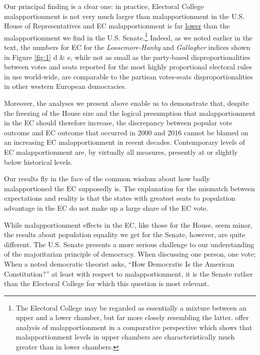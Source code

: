 Our principal finding is a clear one: in practice, Electoral College malapportionment is not very much larger than malapportionment in the U.S. House of Representatives and EC malapportionment is far \underline{lower} than the malapportionment we find in the U.S. Senate.\footnote{The Electoral College may be regarded as essentially a mixture between an upper and a lower chamber, but far more closely resembling the latter. \citet{SamuelsSnyder2001} offer analysis of malapportionment in a comparative perspective which shows that malapportionment levels in upper chambers are characteristically much greater than in lower chambers.} Indeed, as we noted earlier in the text, the numbers for EC for the \textit{Loosemore-Hanby} and \textit{Gallagher} indices shown in Figure \ref{fig:1} d \& e, while not as small as the party-based disproportionalities between votes and seats reported for the most highly proportional electoral rules in use world-wide, are comparable to the partisan votes-seats disproportionalities in other western European democracies.
  
Moreover, the analyses we present above enable us to demonstrate that, despite the freezing of the House size and the logical presumption that malapportionment in the EC should therefore increase, the discrepancy between popular vote outcome and EC outcome that occurred in 2000 and 2016 cannot be blamed on an increasing EC malapportionment in recent decades. Contemporary levels of EC malapportionment are, by virtually all measures, presently at or slightly below historical levels.

Our results fly in the face of the common wisdom about how badly malapportioned the EC supposedly is. The explanation for the mismatch between expectations and reality is that the states with greatest seats to population advantage in the EC do not make up a large share of the EC vote. 

While malapportionment effects in the EC, like those for the House, seem minor, the results about population equality we get for the Senate, however, are quite different. The U.S. Senate presents a more serious challenge to our understanding of the majoritarian principle of democracy. When discussing one person, one vote; When a noted democratic theorist \citet[][]{Dahl2003} asks, ``How Democratic Is the American Constitution?'' at least with respect to malapportionment, it is the Senate rather than the Electoral College for which this question is most relevant. 


